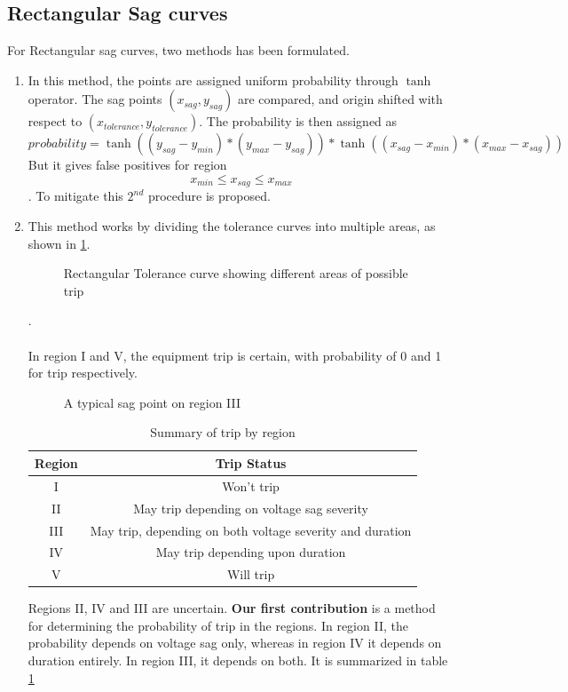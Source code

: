 \documentclass[20pt, a4paper]{report}
\begin{document}
			\subsection{Rectangular Sag curves}
			For Rectangular sag curves, two methods has been formulated. \begin{enumerate}
				\item In this method, the points are assigned uniform probability through $\tanh$ operator. The sag points $(x_{sag}, y_{sag})$ are compared, and origin shifted with respect to $(x_{tolerance},y_{tolerance})$. 
				The probability is then assigned as 
				\begin{equation*}
					probability = \tanh((y_{sag}-y_{min})*(y_{max}-y_{sag})) * \tanh((x_{sag}-x_{min})*(x_{max}-x_{sag}))
				\end{equation*}
				But it gives false positives for region$$x_{min} \leq x_{sag} \leq x_{max}$$.
				To mitigate this $2^{nd}$ procedure is proposed.
				\item This method works by dividing the tolerance curves into multiple areas, as shown in \ref{fig:rec_tol}.
				\begin{figure}[!h]
				\centering
			\caption{Rectangular Tolerance curve showing different areas of possible trip}
			\label{fig:rec_tol}
\end{figure}. 
\paragraph{}In region I and V, the equipment trip is certain, with probability of 0 and 1 for trip respectively.

\begin{figure}[!h]
\centering
\caption{A typical sag point on region III}
\end{figure}
\begin{table}
	\begin{tabular}{|c|c|}
	\hline
	Region& Trip Status \\ \hline
	I & Won't trip\\
	\hline
	II & May trip depending on voltage sag severity\\ \hline
	III & May trip, depending on both voltage severity and duration\\ \hline
	IV & May trip depending upon duration \\ \hline
	V & Will trip \\
	\hline
	
	\end{tabular}
	\caption{Summary of trip by region}
	\label{tab:trip_summary}
	\end{table}
	\newpage Regions II, IV and III are uncertain. \textbf{Our first contribution} is a method for determining the probability of trip in the regions. In region II, the probability depends on voltage sag only, whereas in region IV it depends on duration entirely. In region III, it depends on both. It is summarized in table \ref{tab:trip_summary}
	

\end{enumerate}
\end{document}
